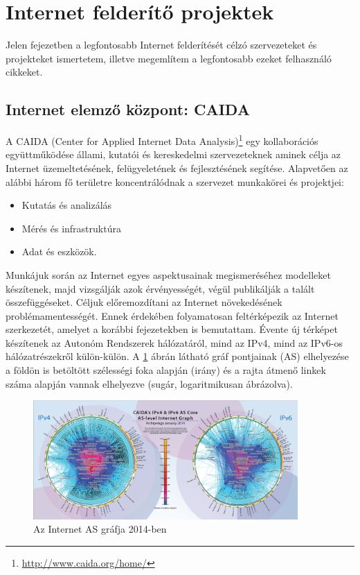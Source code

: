 
\section{Internet felderítő projektek} \label{internet-measurement}



Jelen fejezetben a legfontosabb Internet felderítését célzó szervezeteket és projekteket ismertetem, illetve megemlítem a legfontosabb ezeket felhasználó cikkeket.


\subsection{Internet elemző központ: CAIDA}


A CAIDA (Center for Applied Internet Data Analysis)\footnote{\url{http://www.caida.org/home/}} egy kollaborációs együttműködése állami, kutatói és kereskedelmi szervezeteknek aminek célja az Internet üzemeltetésének, felügyeletének és fejlesztésének segítése. Alapvetően az alábbi három fő területre koncentrálódnak a szervezet munkakörei és projektjei:

\begin{itemize}
\item Kutatás és analizálás
\item Mérés és infrastruktúra
\item Adat és eszközök.
\end{itemize}

Munkájuk során az Internet egyes aspektusainak megismeréséhez modelleket készítenek, majd vizsgálják azok érvényességét, végül publikálják a talált összefüggéseket. Céljuk előremozdítani az Internet növekedésének problémamentességét. Ennek érdekében folyamatosan feltérképezik az Internet szerkezetét, amelyet a korábbi fejezetekben is bemutattam. Évente új \mbox{\glqq térképet \grqq} készítenek az Autonóm Rendszerek hálózatáról, mind az IPv4, mind az IPv6-os hálózatrészekről külön-külön. A \ref{fig:caida-poster} ábrán látható gráf pontjainak (AS) elhelyezése a földön is betöltött szélességi foka alapján (irány) és a rajta átmenő linkek száma alapján vannak elhelyezve (sugár, logaritmikusan ábrázolva).

\begin{figure}[!ht]
	\centering
	\includegraphics[width=0.9\textwidth, keepaspectratio]{figures/caida-poster.png}
	\caption{Az Internet AS gráfja 2014-ben}
	\label{fig:caida-poster}
\end{figure}

